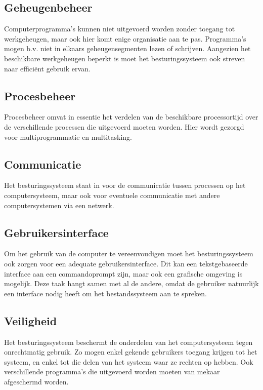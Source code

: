 \subsection{Geheugenbeheer}

Computerprogramma's kunnen niet uitgevoerd worden zonder toegang
tot werkgeheugen, maar ook hier komt enige organisatie aan te pas.
Programma's mogen b.v. niet in elkaars geheugensegmenten lezen of
schrijven. Aangezien het beschikbare werkgeheugen beperkt is moet het
besturingssysteem ook streven naar effici\"ent gebruik ervan.

\subsection{Procesbeheer}

Procesbeheer omvat in essentie het verdelen van de beschikbare
processortijd over de verschillende processen die uitgevoerd moeten
worden. Hier wordt gezorgd voor multiprogrammatie en
multitasking.

\subsection{Communicatie}

Het besturingssysteem staat in voor de communicatie tussen
processen op het computersysteem, maar ook voor eventuele communicatie
met andere computersystemen via een netwerk.

\subsection{Gebruikersinterface}

Om het gebruik van de computer te vereenvoudigen moet het
besturingssysteem ook zorgen voor een adequate gebruikersinterface.
Dit kan een tekstgebaseerde interface aan een commandoprompt zijn,
maar ook een grafische omgeving is mogelijk. Deze taak hangt samen met
al de andere, omdat de gebruiker natuurlijk een interface nodig heeft
om het bestandssysteem aan te spreken.

\subsection{Veiligheid}

Het besturingssysteem beschermt de onderdelen van het computersysteem tegen
onrechtmatig gebruik. Zo mogen enkel gekende gebruikers toegang krijgen tot
het systeem, en enkel tot die delen van het systeem waar ze rechten op hebben.
Ook verschillende programma's die uitgevoerd worden moeten van mekaar
afgeschermd worden.
